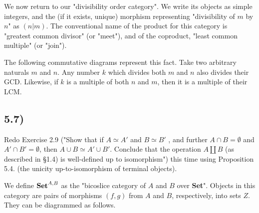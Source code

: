 We now return to our "divisibility order category". We write its objects as simple integers, and the (if it exists, unique) morphism representing "divisibility of $m$ by $n$" as $(n | m)$. The conventional name of the product for this category is "greatest common divisor" (or "meet"), and of the coproduct, "least common multiple" (or "join").

The following commutative diagrams represent this fact. Take two arbitrary naturals $m$ and $n$. Any number $k$ which divides both $m$ and $n$ also divides their GCD. Likewise, if $k$ is a multiple of both $n$ and $m$, then it is a multiple of their LCM. 





\subsection*{5.7)}

Redo Exercise 2.9 ("Show that if $A \simeq A'$ and $B \simeq B'$ , and further $A \cap B = \emptyset$ and $A' \cap B' = \emptyset$, then $A \cup B \simeq A' \cup B'$. Conclude that the operation $A \coprod B$ (as described in §1.4) is well-defined up to isomorphism") this time using Proposition 5.4. (the unicity up-to-isomorphism of terminal objects).

We define $\text{\textbf{Set}}^{A,B}$ as the "bicoslice category of $A$ and $B$ over \textbf{Set}". Objects in this category are pairs of morphisms $(f,g)$ from $A$ and $B$, respectively, into sets $Z$. They can be diagrammed as follows.

